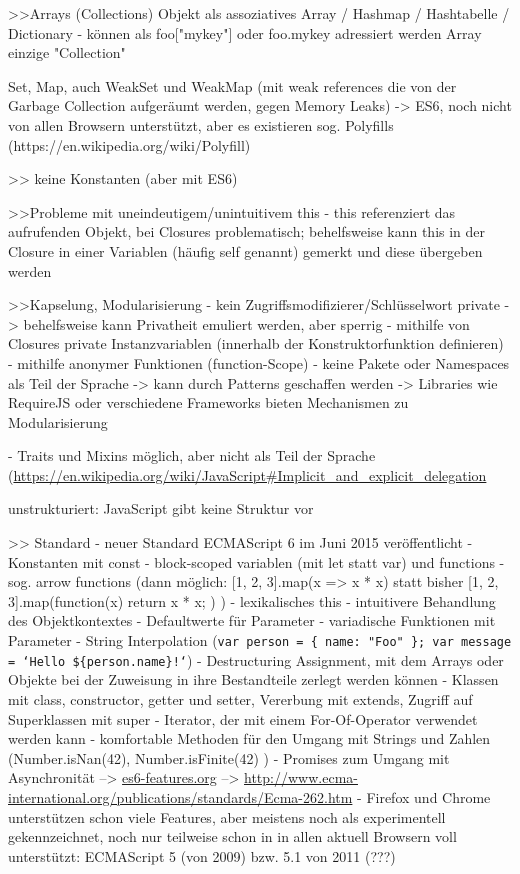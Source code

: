 \documentclass[a4paper, 12pt, listof=totoc, bibliography=totoc]{scrreprt}
\begin{document}
>>Arrays (Collections)
Objekt als assoziatives Array / Hashmap / Hashtabelle / Dictionary
- können als foo["mykey"] oder foo.mykey adressiert werden
Array einzige "Collection"

Set, Map, auch WeakSet und WeakMap (mit weak references die von der Garbage Collection aufgeräumt werden, gegen Memory Leaks) -> ES6, noch nicht von allen Browsern unterstützt, aber es existieren sog. Polyfills (https://en.wikipedia.org/wiki/Polyfill)

>> keine Konstanten (aber mit ES6)

>>Probleme mit uneindeutigem/unintuitivem this
- this referenziert das aufrufenden Objekt, bei Closures problematisch; behelfsweise kann this in der Closure in einer Variablen (häufig self genannt) gemerkt und diese übergeben werden

>>Kapselung, Modularisierung
- kein Zugriffsmodifizierer/Schlüsselwort private
-> behelfsweise kann Privatheit emuliert werden, aber sperrig
	- mithilfe von Closures private Instanzvariablen (innerhalb der Konstruktorfunktion definieren)
	- mithilfe anonymer Funktionen (function-Scope)
- keine Pakete oder Namespaces als Teil der Sprache
-> kann durch Patterns geschaffen werden
-> Libraries wie RequireJS oder verschiedene Frameworks bieten Mechanismen zu Modularisierung

- Traits und Mixins möglich, aber nicht als Teil der Sprache (\url{https://en.wikipedia.org/wiki/JavaScript#Implicit_and_explicit_delegation}

unstrukturiert: JavaScript gibt keine Struktur vor


>> Standard
- neuer Standard ECMAScript 6 im Juni 2015 veröffentlicht
	- Konstanten mit const
	- block-scoped variablen (mit let statt var) und functions
	- sog. arrow functions (dann möglich: [1, 2, 3].map(x => x * x) statt bisher [1, 2, 3].map(function(x) { return x * x; }) )
	- lexikalisches this - intuitivere Behandlung des Objektkontextes
	- Defaultwerte für Parameter
	- variadische Funktionen mit Parameter
	- String Interpolation (\texttt{var person = \{ name: "Foo" \}; var message = `Hello \$\{person.name\}!`})
	- Destructuring Assignment, mit dem Arrays oder Objekte bei der Zuweisung in ihre Bestandteile zerlegt werden können
	- Klassen mit class, constructor, getter und setter, Vererbung mit extends, Zugriff auf Superklassen mit super
	- Iterator, der mit einem For-Of-Operator verwendet werden kann
	- komfortable Methoden für den Umgang mit Strings und Zahlen (Number.isNan(42), Number.isFinite(42) )
	- Promises zum Umgang mit Asynchronität
	-->  \url{es6-features.org}
	-->  \url{http://www.ecma-international.org/publications/standards/Ecma-262.htm}
- Firefox und Chrome unterstützen schon viele Features, aber meistens noch als experimentell gekennzeichnet, noch nur teilweise schon in
in allen aktuell Browsern voll unterstützt: ECMAScript 5 (von 2009) bzw. 5.1 von 2011 (???)
\end{document}
